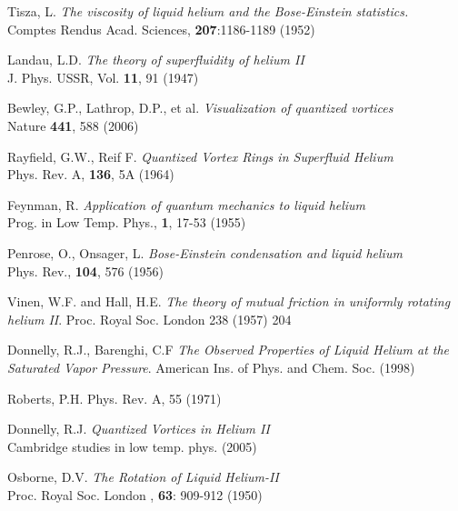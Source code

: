 
\def\bibname{Bibliography}
\begin{thebibliography}{99}
	\addcontentsline{toc}{chapter}{\bibname}

	{\sc Tisza, L.}
	\emph{The viscosity of liquid helium and the Bose-Einstein statistics.}\\
	Comptes Rendus Acad. Sciences, \textbf{207}:1186-1189 (1952)

	{\sc Landau, L.D.}
	\emph{The theory of superfluidity of helium II}\\
	J. Phys. USSR, Vol. \textbf{11}, 91 (1947)

	{\sc Bewley, G.P., Lathrop, D.P., et al.}
	\emph{Visualization of quantized vortices}\\
	Nature \textbf{441}, 588 (2006)

	{\sc Rayfield, G.W., Reif F.}
	\emph{Quantized Vortex Rings in Superfluid Helium}\\
	Phys. Rev. A, \textbf{136}, 5A (1964)

	{\sc Feynman, R.}
	\emph{Application of quantum mechanics to liquid helium}\\
	Prog. in Low Temp. Phys., \textbf{1}, 17-53 (1955)

	{\sc Penrose, O., Onsager, L.}
	\emph{Bose-Einstein condensation and liquid helium}\\
	Phys. Rev., \textbf{104}, 576 (1956)

	{\sc Vinen, W.F.} and {\sc Hall, H.E.}
	\emph{The theory of mutual friction in uniformly rotating helium II}.
	Proc. Royal Soc. London 238 (1957) 204

	{\sc Donnelly, R.J., Barenghi, C.F}
	\emph{The Observed Properties of Liquid Helium at the Saturated Vapor Pressure}. American Ins. of Phys. and Chem. Soc. (1998)

	{\sc Roberts, P.H.}
	\emph{} Phys. Rev. A, 55 (1971)

	{\sc Donnelly, R.J.}
	\emph{Quantized Vortices in Helium II}\\
	Cambridge studies in low temp. phys. (2005)

	{\sc Osborne, D.V.}
	\emph{The Rotation of Liquid Helium-II}\\
	Proc. Royal Soc. London , \textbf{63}: 909-912 (1950)


\end{thebibliography}

